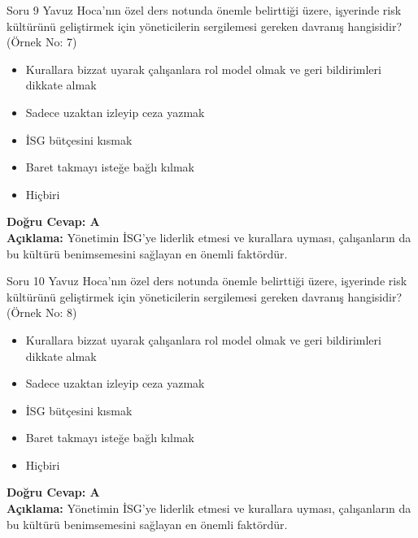 \documentclass[12pt,a4paper]{article}
\begin{document}
\begin{testcard}{Soru 9}
    Yavuz Hoca'nın özel ders notunda önemle belirttiği üzere, işyerinde risk kültürünü geliştirmek için yöneticilerin sergilemesi gereken davranış hangisidir? (Örnek No: 7)
    \begin{itemize}
        \item[A)] Kurallara bizzat uyarak çalışanlara rol model olmak ve geri bildirimleri dikkate almak
        \item[B)] Sadece uzaktan izleyip ceza yazmak
        \item[C)] İSG bütçesini kısmak
        \item[D)] Baret takmayı isteğe bağlı kılmak
        \item[E)] Hiçbiri
    \end{itemize}
    \tcblower
    \textbf{Doğru Cevap: A} \\
    \textbf{Açıklama:} Yönetimin İSG'ye liderlik etmesi ve kurallara uyması, çalışanların da bu kültürü benimsemesini sağlayan en önemli faktördür.
\end{testcard}

\begin{testcard}{Soru 10}
    Yavuz Hoca'nın özel ders notunda önemle belirttiği üzere, işyerinde risk kültürünü geliştirmek için yöneticilerin sergilemesi gereken davranış hangisidir? (Örnek No: 8)
    \begin{itemize}
        \item[A)] Kurallara bizzat uyarak çalışanlara rol model olmak ve geri bildirimleri dikkate almak
        \item[B)] Sadece uzaktan izleyip ceza yazmak
        \item[C)] İSG bütçesini kısmak
        \item[D)] Baret takmayı isteğe bağlı kılmak
        \item[E)] Hiçbiri
    \end{itemize}
    \tcblower
    \textbf{Doğru Cevap: A} \\
    \textbf{Açıklama:} Yönetimin İSG'ye liderlik etmesi ve kurallara uyması, çalışanların da bu kültürü benimsemesini sağlayan en önemli faktördür.
\end{testcard}
\end{document}
